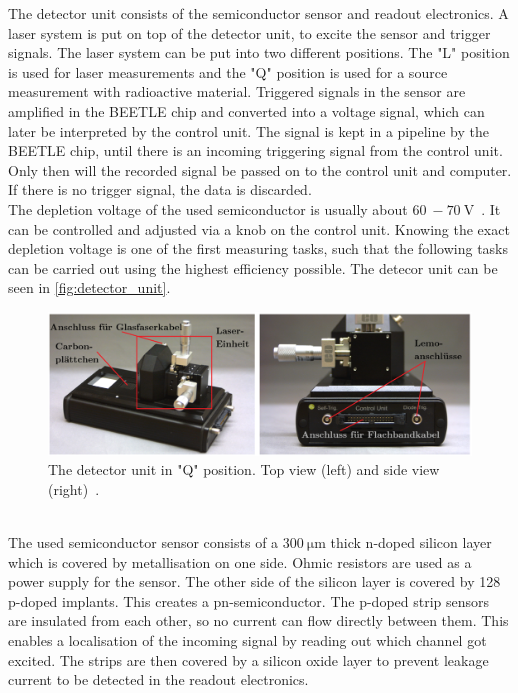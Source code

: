 The detector unit consists of the semiconductor sensor and readout electronics. A laser system is put on top
of the detector unit, to excite the sensor and trigger signals. The laser system can be put into two different
positions. The "L" position is used for laser measurements and the "Q" position is used for a source measurement
with radioactive material. Triggered signals in the sensor are
amplified in the BEETLE chip and converted into a voltage signal, which can later be interpreted by the control unit.
The signal is kept in a pipeline by the BEETLE chip, until there is an incoming triggering signal from the control unit. Only then will the recorded signal
be passed on to the control unit and computer. If there is no trigger signal, the data is discarded.\\
The depletion voltage of the used semiconductor is usually about $\qty{60}{} -  \qty{70}{\volt}$~\cite{SiliconStrip}. It can be controlled and adjusted
via a knob on the control unit. Knowing the exact depletion voltage is one of the first measuring tasks, such that the following
tasks can be carried out using the highest efficiency possible. The detecor unit can be seen in \autoref{fig:detector_unit}.
\begin{figure}
    \centering
    \includegraphics[width = .8\textwidth]{content/pics/detector_unit.png}
    \caption{The detector unit in "Q" position. Top view (left) and side view (right)~\cite{SiliconStrip}.}
    \label{fig:detector_unit}
\end{figure}\\
The used semiconductor sensor consists of a $\qty{300}{\micro\metre}$ thick n-doped silicon layer which is covered by metallisation
on one side. Ohmic resistors are used as a power supply for the sensor. The other side of the silicon layer is covered
by 128 p-doped implants. This creates a pn-semiconductor. The p-doped strip sensors are insulated from each other, so
no current can flow directly between them. This enables a localisation of the incoming signal by reading out which
channel got excited. The strips are then covered by a silicon oxide layer to prevent leakage current to be detected in the readout electronics.
